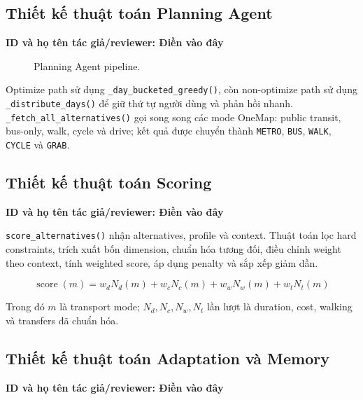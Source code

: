 \documentclass[12pt,a4paper]{article}
\newcommand{\tacgia}{%
  \begin{tcolorbox}[colback=blue!3,colframe=blue!25,boxrule=0.4pt,arc=1mm]
    \small\textbf{ID và họ tên tác giả/reviewer: Điền vào đây}
  \end{tcolorbox}
}
\begin{document}
\subsection{Thiết kế thuật toán Planning Agent}
\tacgia

\begin{figure}[H]
\centering
{}
\caption{Planning Agent pipeline.}
\label{fig:planning-pipeline}
\end{figure}

Optimize path sử dụng \texttt{\_day\_bucketed\_greedy()}, còn non-optimize path sử dụng \texttt{\_distribute\_days()} để giữ thứ tự người dùng và phản hồi nhanh. \texttt{\_fetch\_all\_alternatives()} gọi song song các mode OneMap: public transit, bus-only, walk, cycle và drive; kết quả được chuyển thành \texttt{METRO}, \texttt{BUS}, \texttt{WALK}, \texttt{CYCLE} và \texttt{GRAB}.

\subsection{Thiết kế thuật toán Scoring}
\tacgia

\texttt{score\_alternatives()} nhận alternatives, profile và context. Thuật toán lọc hard constraints, trích xuất bốn dimension, chuẩn hóa tương đối, điều chỉnh weight theo context, tính weighted score, áp dụng penalty và sắp xếp giảm dần.

\[
\operatorname{score}(m) =
w_d N_d(m) +
w_c N_c(m) +
w_w N_w(m) +
w_t N_t(m)
\]

Trong đó \(m\) là transport mode; \(N_d,N_c,N_w,N_t\) lần lượt là duration, cost, walking và transfers đã chuẩn hóa.

\subsection{Thiết kế thuật toán Adaptation và Memory}
\tacgia
\end{document}
